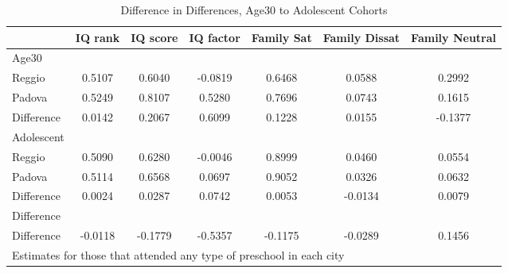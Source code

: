 \begin{table}[htbp]\centering
\caption{Difference in Differences, Age30 to Adolescent Cohorts}
\begin{tabular}{l*{6}{c}}
\hline\hline
            &     IQ rank&    IQ score&   IQ factor&  Family Sat&Family Dissat&Family Neutral\\
\hline
Age30       &            &            &            &            &            &            \\
Reggio      &      0.5107&      0.6040&     -0.0819&      0.6468&      0.0588&      0.2992\\
Padova      &      0.5249&      0.8107&      0.5280&      0.7696&      0.0743&      0.1615\\
Difference  &      0.0142&      0.2067&      0.6099&      0.1228&      0.0155&     -0.1377\\
\hline
Adolescent  &            &            &            &            &            &            \\
Reggio      &      0.5090&      0.6280&     -0.0046&      0.8999&      0.0460&      0.0554\\
Padova      &      0.5114&      0.6568&      0.0697&      0.9052&      0.0326&      0.0632\\
Difference  &      0.0024&      0.0287&      0.0742&      0.0053&     -0.0134&      0.0079\\
\hline
Difference  &            &            &            &            &            &            \\
Difference  &     -0.0118&     -0.1779&     -0.5357&     -0.1175&     -0.0289&      0.1456\\
\hline\hline
\multicolumn{7}{l}{\footnotesize Estimates for those that attended any type of preschool in each city}\\
\end{tabular}
\end{table}
